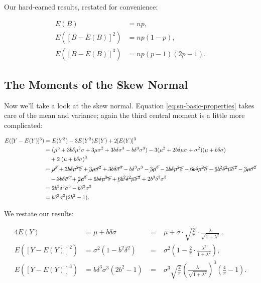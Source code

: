 \documentclass{article}
\begin{document}
Our hard-earned results, restated for convenience:

\begin{align}
  E(B) &= np, \nonumber \\
  E([B - E(B)]^2) &= np(1-p), \\
  E([B - E(B)]^3) &= np(p-1)(2p-1). \nonumber
\end{align}

\subsection{The Moments of the Skew Normal}

Now we'll take a look at the skew normal. Equation
\eqref{eq:sn-basic-properties} takes care of the mean and variance; again the
third central moment is a little more complicated:

\begin{align*}
  E([Y - E(Y)]^3) &= E(Y^3) - 3E(Y^2)E(Y) + 2[E(Y)]^3 \\
  &= (\mu^3 + 3 b \delta \mu^2 \sigma + 3 \mu \sigma^2 + 3 b \delta \sigma^3 - b \delta^3 \sigma^3) - 3 (\mu^2 + 2b \delta \mu \sigma + \sigma^2) (\mu + b \delta \sigma) \\
  & \quad + 2\;(\mu + b \delta \sigma)^3 \\
  &= \cancel{\mu^3} + \cancel{3 b \delta \mu^2 \sigma} + \cancel{3 \mu \sigma^2} + \cancel{3 b \delta \sigma^3} - b \delta^3 \sigma^3 - \cancel{3 \mu^3} - \cancel{3 b \delta \mu^2 \sigma} -
    \cancel{6 b \delta \mu^2 \sigma} - \cancel{6 b^2 \delta^2 \mu \sigma^2} - \cancel{3 \mu \sigma^2} \\
  & \quad - \cancel{3 b \delta \sigma^3} + \cancel{2 \mu^3} + \cancel{6 b \delta \mu^2 \sigma} + \cancel{6 b^2 \delta^2 \mu \sigma^2} + 2 b^3 \delta^3 \sigma^3 \\
  &= 2 b^3 \delta^3 \sigma^3 - b \delta^3 \sigma^3 \\
  &= b \delta^3 \sigma^3 (2b^2 - 1).
\end{align*}

We restate our results:

\begin{alignat}{4}
  E(Y) &= \mu + b \delta \sigma \;&=&\; \mu + \sigma \cdot \sqrt{\frac{2}{\pi}} \cdot \frac{\lambda}{\sqrt{1 + \lambda^2}} \;, \nonumber \\
  E([Y - E(Y)]^2) &= \sigma^2 (1 - b^2 \delta^2) \;&=&\; \sigma^2 \left( 1 - \frac{2}{\pi} \cdot \frac{\lambda^2}{1 + \lambda^2} \right), \\
  E([Y - E(Y)]^3) &= b \delta^3 \sigma^3 (2b^2 - 1) \;&=&\; \sigma^3 \sqrt{\frac{2}{\pi}} \left( \frac{\lambda}{\sqrt{1 + \lambda^2}} \right)^3 \left( \frac{4}{\pi} - 1 \right). \nonumber
\end{alignat}
\end{document}
